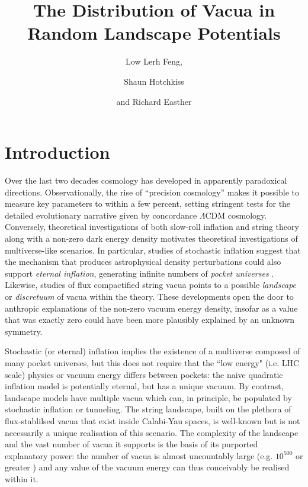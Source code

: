 \documentclass[12pt]{article}
\title{The Distribution of Vacua in Random Landscape Potentials}
\author{Low Lerh Feng,}
\author{Shaun Hotchkiss}
\author{and Richard Easther}
\affiliation{Department of Physics,\\ University of Auckland, \\Private Bag 92019,\\ Auckland, New Zealand}
\begin{document}
\maketitle

\section{Introduction}

Over the last two decades cosmology has developed in apparently paradoxical directions. Observationally, the rise of ``precision cosmology'' makes it possible to measure key parameters to within a few percent, setting stringent tests for the detailed evolutionary narrative given by concordance $\Lambda$CDM cosmology\cite{Planck2018,DES}. Conversely, theoretical investigations of both slow-roll inflation and string theory along with a non-zero dark energy density motivates  theoretical investigations of multiverse-like scenarios. In particular, studies of stochastic inflation \cite{Linde1986,Adshead2007} suggest that the mechanism that produces astrophysical density perturbations could also support {\em eternal inflation\/}, generating infinite numbers of  {\em pocket universes\/} \cite{Guth2001}. Likewise, studies of flux compactified string vacua points to a possible  {\em landscape\/} \cite{Susskind2003} or {\em discretuum\/} \cite{Bousso2000}   of vacua within the theory. These developments open the door to anthropic explanations of the non-zero vacuum energy density, insofar as a value that was  exactly zero could have been more plausibly explained by an unknown symmetry. 

Stochastic (or eternal) inflation implies the existence of a multiverse composed of many pocket universes, but this does not require that the ``low energy" (i.e. LHC scale) physics or vacuum energy differs between pockets:  the naive quadratic inflation model is potentially eternal, but has a unique vacuum.  By contrast, landscape models have multiple vacua which can, in principle, be populated by stochastic inflation or tunneling. The string landscape, built on the plethora of flux-stablilsed vacua that exist inside Calabi-Yau spaces, is well-known but  is not necessarily a unique realisation of this scenario. The complexity of the landscape  and the vast number of vacua it supports is the basis of its purported explanatory power: the number of vacua is almost uncountably large (e.g. $10^{500}$ or greater \cite{Douglas2003}) and any value of the vacuum energy can thus conceivably be realised within it. 
 
\end{document}
